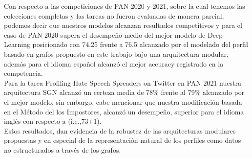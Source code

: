 	Con respecto a las competiciones de PAN 2020 y 2021, sobre la cual tenemos las colecciones completas y las tareas no fueron evaluadas de manera parcial, podemos decir que nuestros modelos alcanzan resultados competitivos y para el caso de PAN 2020 supera el desempeño medio del mejor modelo de Deep Learning \citep{giglou:2020} posicionado con 74.25 frente a 76.5 alcanzado por el modelado del perfil basado en grafos propuesto en este trabajo bajo una arquitectura modular, además para el idioma español alcanzó el mejor accuracy registrado en la competencia. 
	\\
	Para la tarea Profiling Hate Speech Spreaders on Twitter en PAN 2021 nuestra arquitectura SGN alcanzó un certeza media de 78\% frente al 79\% alcanzado por el mejor modelo, sin embargo, cabe mencionar que nuestra modificación basada en el Método del los Impostores, alcanzó un desempeño, superior para el idioma inglés con respecto a  \citep{sinno:2021} (i.e.,73$+$1).
	\\
	Estos resultados, dan evidencia de la robustez de las arquitecturas modulares propuestas y en especial de la representación natural de los perfiles como datos no estructurados a través de los grafos.